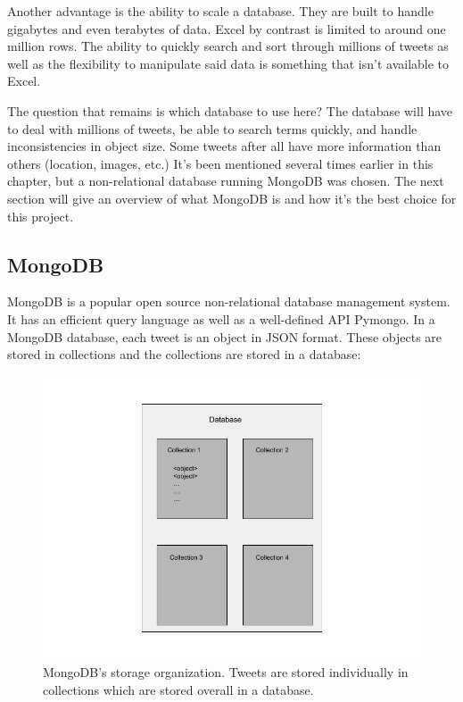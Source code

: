 \documentclass[11pt, twoside, reqno]{article}
\begin{document}
Another advantage is the ability to scale a database. They are built to handle gigabytes and even terabytes of data. Excel by contrast is limited to around one million rows. The ability to quickly search and sort through millions of tweets as well as the flexibility to manipulate said data is something that isn't available to Excel.

The question that remains is which database to use here? The database will have to deal with millions of tweets, be able to search terms quickly, and handle inconsistencies in object size. Some tweets after all have more information than others (location, images, etc.) It's been mentioned several times earlier in this chapter, but a non-relational database running MongoDB was chosen. The next section will give an overview of what MongoDB is and how it's the best choice for this project. 

\subsection{MongoDB}
\hspace{0.2in} MongoDB is a popular open source non-relational database management system. It has an efficient query language as well as a well-defined API Pymongo. In a MongoDB database, each tweet is an object in JSON format. These objects are stored in collections and the collections are stored in a database:

\begin{figure}[H]
	\centering
	\includegraphics[scale=0.5]{database}
	\caption{MongoDB's storage organization. Tweets are stored individually in collections which are stored overall in a database.}
	\label{fig:dbstructure}
\end{figure}
\end{document}
